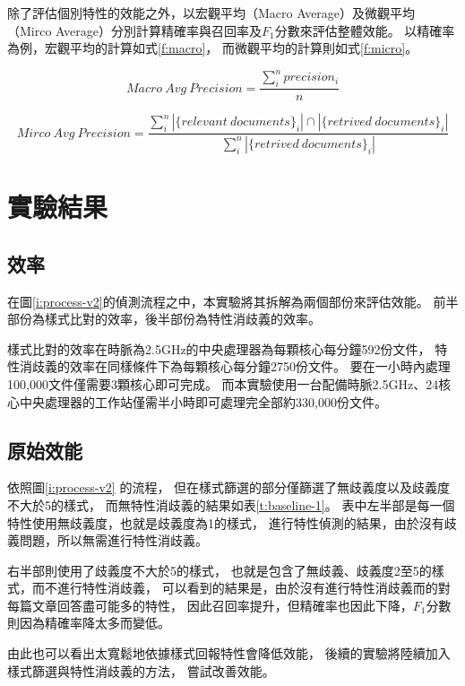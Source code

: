 除了評估個別特性的效能之外，以宏觀平均（Macro Average）及微觀平均（Mirco Average）分別計算精確率與召回率及$F_1$分數來評估整體效能。
以精確率為例，宏觀平均的計算如式\ref{f:macro}，
而微觀平均的計算則如式\ref{f:micro}。

\begin{equation}
    \label{f:macro}
    Macro\ Avg\ Precision=\frac{\sum_i^n precision_i}{n}
\end{equation}

\begin{equation}
    \label{f:micro}
    Mirco\ Avg\ Precision=\frac{\sum_i^n |\{relevant\ documents\}_i|\cap|\{retrived\ documents\}_i|}{\sum_i^n |\{retrived\ documents\}_i|}
\end{equation}


\section{實驗結果}
\label{s:result}

\subsection{效率}
在圖\ref{i:process-v2}的偵測流程之中，本實驗將其拆解為兩個部份來評估效能。
前半部份為樣式比對的效率，後半部份為特性消歧義的效率。

樣式比對的效率在時脈為2.5GHz的中央處理器為每顆核心每分鐘592份文件，
特性消歧義的效率在同樣條件下為每顆核心每分鐘2750份文件。
要在一小時內處理100,000文件僅需要3顆核心即可完成。
而本實驗使用一台配備時脈2.5GHz、24核心中央處理器的工作站僅需半小時即可處理完全部約330,000份文件。

\subsection{原始效能}
依照圖\ref{i:process-v2} 的流程，
但在樣式篩選的部分僅篩選了無歧義度以及歧義度不大於5的樣式，
而無特性消歧義的結果如表\ref{t:baseline-1}。
表中左半部是每一個特性使用無歧義度，也就是歧義度為1的樣式，
進行特性偵測的結果，由於沒有歧義問題，所以無需進行特性消歧義。

右半部則使用了歧義度不大於5的樣式，
也就是包含了無歧義、歧義度2至5的樣式，而不進行特性消歧義，
可以看到的結果是，由於沒有進行特性消歧義而的對每篇文章回答盡可能多的特性，
因此召回率提升，但精確率也因此下降，$F_1$分數則因為精確率降太多而變低。

由此也可以看出太寬鬆地依據樣式回報特性會降低效能，
後續的實驗將陸續加入樣式篩選與特性消歧義的方法， 嘗試改善效能。

